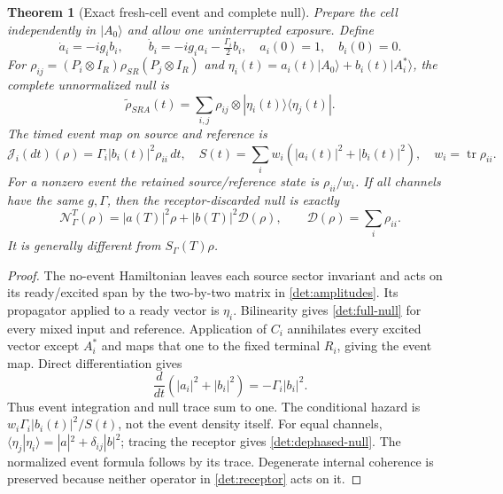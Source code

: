 \documentclass[11pt,oneside,openany]{book}
\newtheorem{theorem}{Theorem}[chapter]
\theoremstyle{definition}
\theoremstyle{remark}\newtheorem{remark}[theorem]{Remark}
\begin{document}
\begin{theorem}[Exact fresh-cell event and complete null]
\label{det:finite-receptor}
Prepare the cell independently in $|A_0\rangle$ and allow one
uninterrupted exposure. Define
\begin{equation}
 \dot a_i=-ig_ib_i,\qquad
 \dot b_i=-ig_ia_i-\tfrac{\Gamma_i}{2}b_i,
 \quad a_i(0)=1,\quad b_i(0)=0.                 \label{det:amplitudes}
\end{equation}
For $\rho_{ij}=(P_i\otimes I_R)\rho_{SR}(P_j\otimes I_R)$ and
$\eta_i(t)=a_i(t)|A_0\rangle+b_i(t)|A_i^*\rangle$, the complete
unnormalized null is
\begin{equation}
 \widetilde\rho_{SRA}(t)=\sum_{i,j}\rho_{ij}\otimes
                           |\eta_i(t)\rangle\langle\eta_j(t)|.             \label{det:full-null}
\end{equation}
The timed event map on source and reference is
\begin{equation}
 \mathcal J_i(dt)(\rho)=\Gamma_i|b_i(t)|^2\rho_{ii}\,dt,
 \quad S(t)=\sum_iw_i(|a_i(t)|^2+|b_i(t)|^2),
 \quad w_i=\operatorname{tr}\rho_{ii}.          \label{det:finite-events}
\end{equation}
For a nonzero event the retained source/reference state is
$\rho_{ii}/w_i$. If all channels have the same $g,\Gamma$, then
the receptor-discarded null is exactly
\begin{equation}
 \mathcal N_\Gamma^T(\rho)=|a(T)|^2\rho+
                         |b(T)|^2\mathcal D(\rho),
 \qquad \mathcal D(\rho)=\sum_i\rho_{ii}.       \label{det:dephased-null}
\end{equation}
It is generally different from $S_\Gamma(T)\rho$.
\end{theorem}
\begin{proof}
The no-event Hamiltonian leaves each source sector invariant and acts
on its ready/excited span by the two-by-two matrix in
\eqref{det:amplitudes}. Its propagator applied to a ready vector is
$\eta_i$. Bilinearity gives \eqref{det:full-null} for every mixed
input and reference. Application of $C_i$ annihilates every excited
vector except $A_i^*$ and maps that one to the fixed terminal $R_i$,
giving the event map. Direct differentiation gives
\[
 \frac{d}{dt}(|a_i|^2+|b_i|^2)=-\Gamma_i|b_i|^2.
\]
Thus event integration and null trace sum to one. The conditional
hazard is $w_i\Gamma_i|b_i(t)|^2/S(t)$, not the event density itself.
For equal channels,
$\langle\eta_j|\eta_i\rangle=|a|^2+\delta_{ij}|b|^2$;
tracing the receptor gives \eqref{det:dephased-null}. The normalized
event formula follows by its trace. Degenerate internal coherence is
preserved because neither operator in \eqref{det:receptor} acts on it.
\end{proof}
\end{document}
